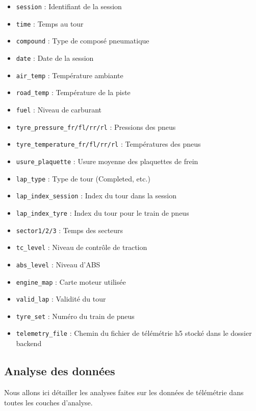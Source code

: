 \documentclass[a4paper,12pt]{report}
\begin{document}
\begin{itemize}
    \item \texttt{session} : Identifiant de la session
    \item \texttt{time} : Temps au tour
    \item \texttt{compound} : Type de composé pneumatique
    \item \texttt{date} : Date de la session
    \item \texttt{air\_temp} : Température ambiante
    \item \texttt{road\_temp} : Température de la piste
    \item \texttt{fuel} : Niveau de carburant
    \item \texttt{tyre\_pressure\_fr/fl/rr/rl} : Pressions des pneus
    \item \texttt{tyre\_temperature\_fr/fl/rr/rl} : Températures des pneus
    \item \texttt{usure\_plaquette} : Usure moyenne des plaquettes de frein
    \item \texttt{lap\_type} : Type de tour (Completed, etc.)
    \item \texttt{lap\_index\_session} : Index du tour dans la session
    \item \texttt{lap\_index\_tyre} : Index du tour pour le train de pneus
    \item \texttt{sector1/2/3} : Temps des secteurs
    \item \texttt{tc\_level} : Niveau de contrôle de traction
    \item \texttt{abs\_level} : Niveau d'ABS
    \item \texttt{engine\_map} : Carte moteur utilisée
    \item \texttt{valid\_lap} : Validité du tour
    \item \texttt{tyre\_set} : Numéro du train de pneus
    \item \texttt{telemetry\_file} : Chemin du fichier de télémétrie h5 stocké dans le dossier backend
\end{itemize}

\subsection{Analyse des données}

Nous allons ici détailler les analyses faites sur les données de télémétrie dans toutes les couches d'analyse.
\end{document}
